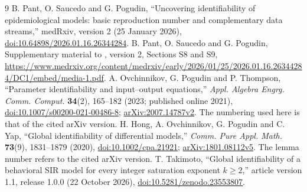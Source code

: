 \documentclass[10pt,a4paper]{article}
\theoremstyle{definition}\newtheorem{definition}[theorem]{Definition}
\begin{document}
{\raggedright
\begin{thebibliography}{9}
B. Pant, O. Saucedo and G. Pogudin,
``Uncovering identifiability of epidemiological models: basic
reproduction number and complementary data streams,''
medRxiv, version 2 (25 January 2026),
\href{https://doi.org/10.64898/2026.01.16.26344284}{doi:10.64898/2026.01.16.26344284}.
B. Pant, O. Saucedo and G. Pogudin,
Supplementary material to \cite{PSP}, version 2, Sections S8 and S9,
\url{https://www.medrxiv.org/content/medrxiv/early/2026/01/25/2026.01.16.26344284/DC1/embed/media-1.pdf}.
A. Ovchinnikov, G. Pogudin and P. Thompson,
``Parameter identifiability and input--output equations,''
\emph{Appl. Algebra Engrg. Comm. Comput.} \textbf{34}(2), 165--182
(2023; published online 2021),
\href{https://doi.org/10.1007/s00200-021-00486-8}{doi:10.1007/s00200-021-00486-8};
\href{https://arxiv.org/abs/2007.14787v2}{arXiv:2007.14787v2}.
The numbering used here is that of the cited arXiv version.
H. Hong, A. Ovchinnikov, G. Pogudin and C. Yap,
``Global identifiability of differential models,''
\emph{Comm. Pure Appl. Math.} \textbf{73}(9), 1831--1879 (2020),
\href{https://doi.org/10.1002/cpa.21921}{doi:10.1002/cpa.21921};
\href{https://arxiv.org/abs/1801.08112v5}{arXiv:1801.08112v5}.
The lemma number refers to the cited arXiv version.
T. Takimoto,
``Global identifiability of a behavioral SIR model for every integer
saturation exponent $k\geq2$,'' article version 1.1, release 1.0.0
(22 October 2026),
\href{https://doi.org/10.5281/zenodo.23553807}{doi:10.5281/zenodo.23553807}.
\end{thebibliography}
}
\end{document}

